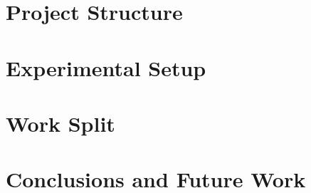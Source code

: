 \documentclass{article}
\begin{document}
\newpage

\section{Project Structure}


\section{Experimental Setup}


\section{Work Split}


\section{Conclusions and Future Work}

\end{document}
